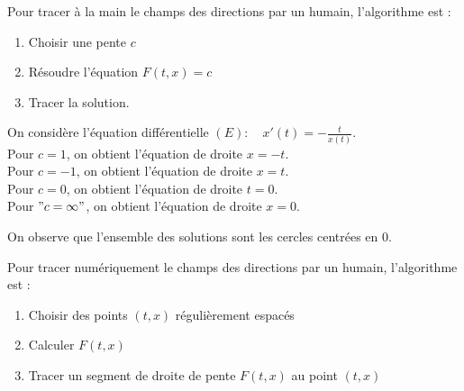 \documentclass{book}
\begin{document}
Pour tracer à la main le champs des directions par un humain, l'algorithme est :
\begin{enumerate}
\item  Choisir une pente $c$
\item  Résoudre l'équation $F(t,x)=c$
\item  Tracer la solution.
\end{enumerate}
\begin{Exemple}[Cercle] On considère l'équation différentielle $(E):\quad x'(t) = -\frac{t}{x(t)}$.\\
Pour $c=1$, on obtient l'équation de droite $x=-t$.\\
Pour $c=-1$, on obtient l'équation de droite $x=t$.\\
Pour $c=0$, on obtient l'équation de droite $t=0$.\\
Pour $"c=\infty"$, on obtient l'équation de droite $x=0$.
\begin{center}
\end{center}
On observe que l'ensemble des solutions sont les cercles centrées en 0.
\end{Exemple}
Pour tracer numériquement le champs des directions par un humain, l'algorithme est :
\begin{enumerate}
\item Choisir des points $(t,x)$ régulièrement espacés
\item Calculer $F(t,x)$
\item Tracer un segment de droite de pente $F(t,x)$ au point $(t,x)$
\end{enumerate}
\end{document}
